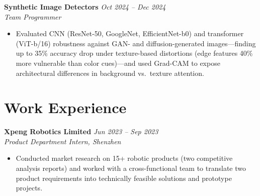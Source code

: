 \documentclass[a4paper,10pt]{article}
\begin{document}
\textbf{Synthetic Image Detectors} \hfill \textit{Oct 2024 -- Dec 2024} \\
\textit{Team Programmer}
\begin{itemize}[noitemsep,leftmargin=*,topsep=2pt]
    \item Evaluated CNN (ResNet-50, GoogleNet, EfficientNet-b0) and transformer (ViT-b/16) robustness against GAN- and diffusion-generated images---finding up to 35\% accuracy drop under texture-based distortions (edge features 40\% more vulnerable than color cues)---and used Grad-CAM to expose architectural differences in background vs.\ texture attention.
\end{itemize}


\section*{Work Experience}

\textbf{Xpeng Robotics Limited} \hfill \textit{Jun 2023 -- Sep 2023} \\
\textit{Product Department Intern, Shenzhen}
\begin{itemize}[noitemsep,leftmargin=*,topsep=2pt]
    \item Conducted market research on 15+ robotic products (two competitive analysis reports) and worked with a cross-functional team to translate two product requirements into technically feasible solutions and prototype projects.
\end{itemize}
\end{document}
